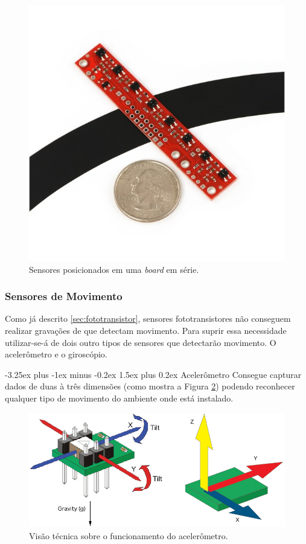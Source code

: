 \documentclass[portugues, brazil, a4paper,12pt]{article}
\makeatletter
\renewcommand{\paragraph}{\@startsection{paragraph}{4}{0ex}%
   {-3.25ex plus -1ex minus -0.2ex}%
   {1.5ex plus 0.2ex}%
   {\normalfont\normalsize\bfseries}}
\makeatother
\begin{document}
				\begin{figure}[H]
					\centering
					\includegraphics[width=0.7\linewidth]{img/elementos-sensores_series.jpg}
					\caption{Sensores posicionados em uma \textit{board} em série.}
					\label{fig:sensores_series}
				\end{figure}


		\subsubsection{Sensores de Movimento} \label{sec:movimentos}
			Como já descrito \ref{sec:fototransistor}, sensores fototransistores não conseguem realizar gravações de que detectam movimento. Para suprir essa necessidade utilizar-se-á de dois outro tipos de sensores que detectarão movimento. O acelerômetro e o giroscópio.


			\paragraph{Acelerômetro}
				Consegue capturar dados de duas à três dimensões (como mostra a Figura \ref{fig:accelerometer}) podendo reconhecer qualquer tipo de movimento do ambiente onde está instalado.

				\begin{figure}[H]
					\centering
					\includegraphics[width=0.9\linewidth]{img/elementos-accelerometer.jpg}
					\caption{Visão técnica sobre o funcionamento do acelerômetro.}
					\label{fig:accelerometer}
				\end{figure}
\end{document}
